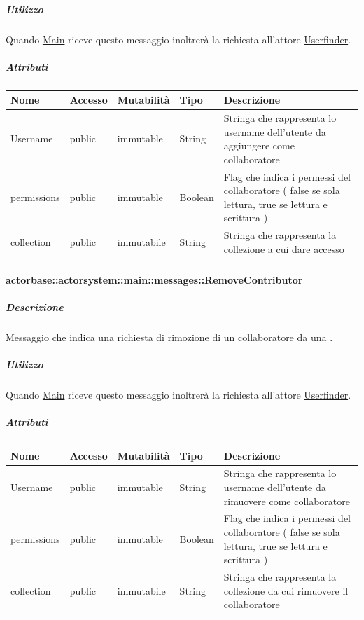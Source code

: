 \documentclass{scalatekids-article}
\begin{document}
\subparagraph{Utilizzo}

Quando \hyperref[sec:actorbase::actorsystem::main::Main]{Main}
riceve questo messaggio inoltrerà la richiesta all'attore
\hyperref[sec:actorbase::actorsystem::userfinder::Userfinder]{Userfinder}.

\subparagraph{Attributi}
\begin{tabular}{| p{3cm} | p{1.5cm} | p{2cm} | p{2cm} | p{8.5cm} |}
  \hline
  Nome & Accesso & Mutabilità & Tipo & Descrizione\\
  \hline
  Username & public & immutable & String & Stringa che rappresenta lo username dell'utente da aggiungere come collaboratore\\
  \hline
  permissions & public & immutable & Boolean & Flag che indica i permessi del collaboratore ( false se sola lettura, true se lettura e scrittura )\\
  \hline
  collection & public & immutabile & String & Stringa che rappresenta la collezione a cui dare accesso\\
  \hline
\end{tabular}

\paragraph{actorbase::actorsystem::main::messages::RemoveContributor}
\label{sec:actorbase::actorsystem::main::messages::RemoveContributor}

\subparagraph{Descrizione}

Messaggio che indica una richiesta di rimozione di un collaboratore da una
.

\subparagraph{Utilizzo}

Quando \hyperref[sec:actorbase::actorsystem::main::Main]{Main}
riceve questo messaggio inoltrerà la richiesta all'attore \hyperref[sec:actorbase::actorsystem::userfinder::Userfinder]{Userfinder}.

\subparagraph{Attributi}
\begin{tabular}{| p{3cm} | p{1.5cm} | p{2cm} | p{2cm} | p{8.5cm} |}
  \hline
  Nome & Accesso & Mutabilità & Tipo & Descrizione\\
  \hline
  Username & public & immutable & String & Stringa che rappresenta lo username dell'utente da rimuovere come collaboratore\\
  \hline
  permissions & public & immutable & Boolean & Flag che indica i permessi del collaboratore ( false se sola lettura, true se lettura e scrittura )\\
  \hline
  collection & public & immutabile & String & Stringa che rappresenta la collezione da cui rimuovere il collaboratore\\
  \hline
\end{tabular}
\end{document}
